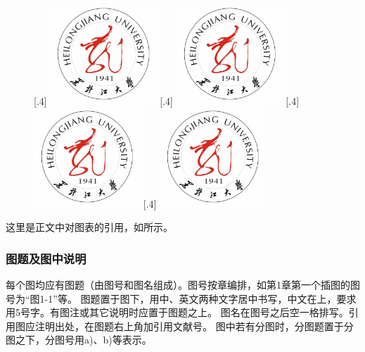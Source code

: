 \begin{figure}[h]
    \centering
    [.4\textwidth]
    {\includegraphics[width=40mm]{img/hlju_logo.jpg}}
    [.4\textwidth]
    {\includegraphics[width=40mm]{img/hlju_logo.jpg}}
    [.4\textwidth]
    {\includegraphics[width=40mm]{img/hlju_logo.jpg}}
    [.4\textwidth]
    {\includegraphics[width=40mm]{img/hlju_logo.jpg}}
    \label{Fig:1}
\end{figure}

这里是正文中对图表的引用，如所示。

\subsubsection{图题及图中说明}
每个图均应有图题（由图号和图名组成）。图号按章编排，如第1章第一个插图的图号为“图1-1”等。
图题置于图下，用中、英文两种文字居中书写，中文在上，要求用5号字。有图注或其它说明时应置于图题之上。
图名在图号之后空一格排写。引用图应注明出处，在图题右上角加引用文献号。
图中若有分图时，分图题置于分图之下，分图号用a)、b)等表示。

